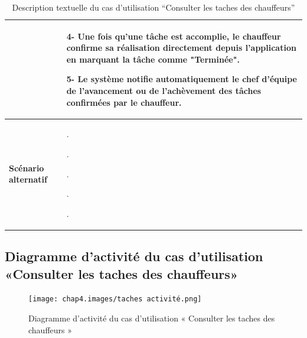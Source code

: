 \begin{table}[htbp]
  \centering
  \renewcommand{\arraystretch}{1.7} %
  \begin{tabular}{|p{4cm}|p{9cm}|}

                                 & 4- Une fois qu’une tâche est accomplie, le chauffeur confirme sa réalisation directement depuis l’application en marquant la tâche comme "Terminée". \newline

    5- Le système notifie automatiquement le chef d’équipe de l’avancement ou de l’achèvement des tâches confirmées par le chauffeur.                                                            \\


    \hline
    \textbf{Scénario alternatif} & .\newline

    . \newline

    .\newline

    .\newline

    .                                                                                                                                                                                            \\

    \hline
  \end{tabular}
  \caption{Description textuelle du cas d’utilisation “Consulter les taches des chauffeurs”}

\end{table}


\newpage
\subsection{Diagramme d'activité du cas d’utilisation «Consulter les taches des chauffeurs» }

\begin{figure}[ht!]
  \centering
  \texttt{[image: chap4.images/taches activité.png]}
  \caption{ Diagramme d'activité du cas d’utilisation « Consulter les taches des chauffeurs » }
\end{figure}



